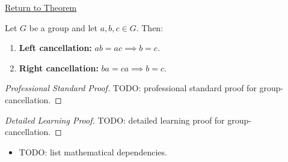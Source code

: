 \newpage
{}
\label{prf:group-cancellation}

\begin{remark*}[Return]
\hyperref[prop:group-cancellation]{Return to Theorem}
\end{remark*}

\begin{theorem*}
Let $G$ be a group and let $a, b, c \in G$. Then:
\begin{enumerate}[label=(\roman*)]
  \item \textbf{Left cancellation:} $ab = ac \implies b = c$.
  \item \textbf{Right cancellation:} $ba = ca \implies b = c$.
\end{enumerate}
\end{theorem*}

\begin{proof}[Professional Standard Proof]
\LRAProofBodyStart
TODO: professional standard proof for group-cancellation.
\end{proof}

\begin{proof}[Detailed Learning Proof]
\LRAProofBodyStart
TODO: detailed learning proof for group-cancellation.
\end{proof}

\begin{remark*}
\end{remark*}

\begin{dependencies}
\begin{itemize}
  \item TODO: list mathematical dependencies.
\end{itemize}
\end{dependencies}

\clearpage
